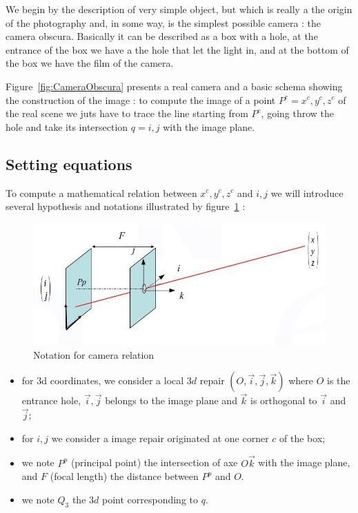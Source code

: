We begin by the description of very simple object, but which is really a the origin of
the photography and, in some way, is the simplest possible camera  :  the camera obscura.
Basically it can be described as a box with a hole, at the entrance of the box we have
a the hole that let the light in, and at the bottom of the box we have the film of
the camera. 

Figure~\ref{fig:CameraObscura} presents a real camera and a basic schema showing
the construction of the image :  to compute the image of a point $P^c=x^c,y^c,z^c$ of the real scene
we juts have to trace the line starting from $P^c$, going throw the hole and take its intersection $q=i,j$
with the image plane.


\subsection{Setting equations}

To compute a mathematical relation between $x^c,y^c,z^c$ and $i,j$ we will introduce several hypothesis 
and notations illustrated by figure~\ref{fig:Camera3DNote} :

\begin{figure}
\centering
\includegraphics[width=12cm]{Methods/Images/Camera3D.jpg}\caption{Notation for camera relation}
	\label{fig:Camera3DNote}
\end{figure}

\begin{itemize}
	\item for 3d coordinates, we consider a local $3d$ repair $(O,\vec{i},\vec{j},\vec{k})$  where $O$ is the entrance hole,
              $\vec{i},\vec{j}$ belongs to the image plane and $\vec{k}$ is orthogonal to  $\vec{i}$ and $\vec{j}$;

	\item for $i,j$ we consider a image repair originated at one corner $c$ of the box;

	\item we note $P^p$ (principal point)  the intersection of axe $O\vec{k}$  with the image plane,
	      and $F$ (focal length) the distance between $P^p$ and $O$.

        \item we note $Q_3$  the $3d$ point corresponding to $q$.

\end{itemize}

